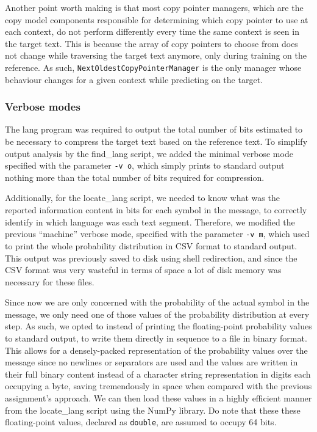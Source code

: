 \documentclass{article}
\begin{document}
Another point worth making is that most copy pointer managers, which are the copy model components responsible for determining which copy pointer to use at each context, do not perform differently every time the same context is seen in the target text.
This is because the array of copy pointers to choose from does not change while traversing the target text anymore, only during training on the reference.
As such, \verb|NextOldestCopyPointerManager| is the only manager whose behaviour changes for a given context while predicting on the target.


\subsubsection{Verbose modes}
\label{subsubsec:methodology_lang_model_verbose}

The lang program was required to output the total number of bits estimated to be necessary to compress the target text based on the reference text.
To simplify output analysis by the find_lang script, we added the minimal verbose mode specified with the parameter \verb|-v o|, which simply prints to standard output nothing more than the total number of bits required for compression.

Additionally, for the locate_lang script, we needed to know what was the reported information content in bits for each symbol in the message, to correctly identify in which language was each text segment.
Therefore, we modified the previous ``machine'' verbose mode, specified with the parameter \verb|-v m|, which used to print the whole probability distribution in CSV format to standard output.
This output was previously saved to disk using shell redirection, and since the CSV format was very wasteful in terms of space a lot of disk memory was necessary for these files.

Since now we are only concerned with the probability of the actual symbol in the message, we only need one of those values of the probability distribution at every step.
As such, we opted to instead of printing the floating-point probability values to standard output, to write them directly in sequence to a file in binary format.
This allows for a densely-packed representation of the probability values over the message since no newlines or separators are used and the values are written in their full binary content instead of a character string representation in digits each occupying a byte, saving tremendously in space when compared with the previous assignment's approach.
We can then load these values in a highly efficient manner from the locate_lang script using the NumPy library.
Do note that these these floating-point values, declared as \verb|double|, are assumed to occupy 64 bits.
\end{document}
